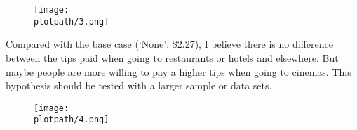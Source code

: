 \documentclass[a4paper]{article}
\begin{document}
\begin{figure}[H]
\begin{center}
\texttt{[image: \\plotpath/3.png]}
\end{center}
\label{}
\end{figure}

Compared with the base case (`None': \$2.27), I believe there is no difference between the tips paid when going to restaurants or hotels and elsewhere. But maybe people are more willing to pay a higher tips when going to cinemas. This hypothesis should be tested with a larger sample or data sets.

\begin{figure}[H]
\begin{center}
\texttt{[image: \\plotpath/4.png]}
\end{center}
\label{}
\end{figure}
\end{document}
